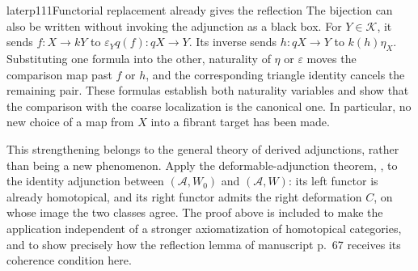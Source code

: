 \begin{dcomment}{later}{p111}{Functorial replacement already gives the reflection}
The bijection can also be written without invoking the adjunction as a black box. For $Y\in\mathcal K$, it sends $f:X\to kY$ to $\varepsilon_Yq(f):qX\to Y$. Its inverse sends $h:qX\to Y$ to $k(h)\eta_X$. Substituting one formula into the other, naturality of $\eta$ or $\varepsilon$ moves the comparison map past $f$ or $h$, and the corresponding triangle identity cancels the remaining pair. These formulas establish both naturality variables and show that the comparison with the coarse localization is the canonical one. In particular, no new choice of a map from $X$ into a fibrant target has been made.

This strengthening belongs to the general theory of derived adjunctions, rather than being a new phenomenon. Apply the deformable-adjunction theorem, \citet[Theorem~2.2.11]{Riehl2014}, to the identity adjunction between $(\mathcal A,W_0)$ and $(\mathcal A,W)$: its left functor is already homotopical, and its right functor admits the right deformation $C$, on whose image the two classes agree. The proof above is included to make the application independent of a stronger axiomatization of homotopical categories, and to show precisely how the reflection lemma of manuscript p.~67 receives its coherence condition here.
\end{dcomment}

